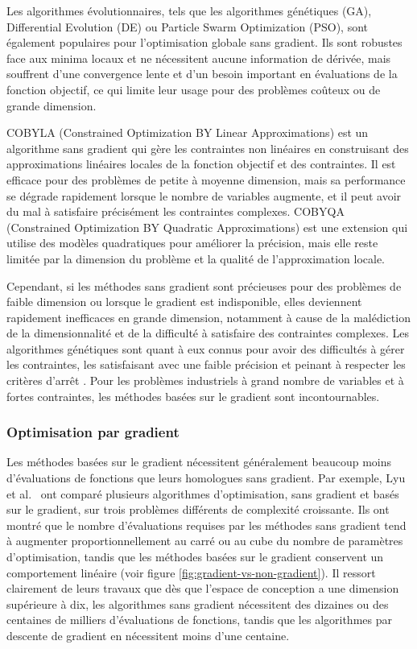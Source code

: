 Les algorithmes évolutionnaires, tels que les algorithmes génétiques (GA), Differential Evolution (DE) ou Particle Swarm Optimization (PSO), sont également populaires pour l'optimisation globale sans gradient. Ils sont robustes face aux minima locaux et ne nécessitent aucune information de dérivée, mais souffrent d'une convergence lente et d'un besoin important en évaluations de la fonction objectif, ce qui limite leur usage pour des problèmes coûteux ou de grande dimension.

COBYLA (Constrained Optimization BY Linear Approximations) \citep{Powell1994} est un algorithme sans gradient qui gère les contraintes non linéaires en construisant des approximations linéaires locales de la fonction objectif et des contraintes. Il est efficace pour des problèmes de petite à moyenne dimension, mais sa performance se dégrade rapidement lorsque le nombre de variables augmente, et il peut avoir du mal à satisfaire précisément les contraintes complexes. COBYQA (Constrained Optimization BY Quadratic Approximations) \citep{Ragonneau2022,Ragonneau2024} est une extension qui utilise des modèles quadratiques pour améliorer la précision, mais elle reste limitée par la dimension du problème et la qualité de l'approximation locale.

Cependant, si les méthodes sans gradient sont précieuses pour des problèmes de faible dimension ou lorsque le gradient est indisponible, elles deviennent rapidement inefficaces en grande dimension, notamment à cause de la malédiction de la dimensionnalité et de la difficulté à satisfaire des contraintes complexes. Les algorithmes génétiques sont quant à eux connus pour avoir des difficultés à gérer les contraintes, les satisfaisant avec une faible précision et peinant à respecter les critères d'arrêt \citep{Parr2010}. Pour les problèmes industriels à grand nombre de variables et à fortes contraintes, les méthodes basées sur le gradient sont incontournables.


\subsubsection{Optimisation par gradient}

Les méthodes basées sur le gradient nécessitent généralement beaucoup moins d'évaluations de fonctions que leurs homologues sans gradient. Par exemple, Lyu et al.~\citep{Lyu2014} ont comparé plusieurs algorithmes d'optimisation, sans gradient et basés sur le gradient, sur trois problèmes différents de complexité croissante. Ils ont montré que le nombre d'évaluations requises par les méthodes sans gradient tend à augmenter proportionnellement au carré ou au cube du nombre de paramètres d'optimisation, tandis que les méthodes basées sur le gradient conservent un comportement linéaire (voir figure \ref{fig:gradient-vs-non-gradient}). Il ressort clairement de leurs travaux que dès que l'espace de conception a une dimension supérieure à dix, les algorithmes sans gradient nécessitent des dizaines ou des centaines de milliers d'évaluations de fonctions, tandis que les algorithmes  par descente de gradient en nécessitent moins d'une centaine.

